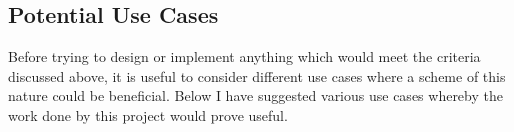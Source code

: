 \subsection{Potential Use Cases}

Before trying to design or implement anything which would meet the criteria discussed above, it is useful to consider different use cases where a scheme of this nature could be beneficial. Below I have suggested various use cases whereby the work done by this project would prove useful.






